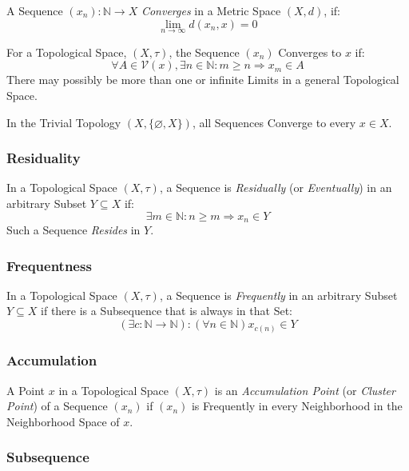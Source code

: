 A Sequence $(x_n) : \mathbb{N} \rightarrow X$
\emph{Converges} in a Metric Space $(X,d)$, if:
\[
  \lim_{n \rightarrow \infty} d (x_n, x) = 0
\]

For a Topological Space, $(X,\tau)$, the Sequence $(x_n)$ Converges to
$x$ if:
\[
  \forall A \in \mathcal{V}(x), \exists n \in \mathbb{N}
  : m \geq n \Rightarrow x_m \in A
\]
There may possibly be more than one or infinite Limits in a general
Topological Space.

In the Trivial Topology $(X, \{\varnothing, X\})$, all Sequences
Converge to every $x \in X$.



\subsubsection{Residuality}\label{sec:reside}

In a Topological Space $(X, \tau)$, a Sequence is \emph{Residually}
(or \emph{Eventually}) in an arbitrary Subset $Y \subseteq X$ if:
\[
  \exists m \in \mathbb{N} : n \geq m \Rightarrow x_n \in Y
\]
Such a Sequence \emph{Resides} in $Y$.



\subsubsection{Frequentness}\label{sec:frequent}

In a Topological Space $(X, \tau)$, a Sequence is \emph{Frequently}
in an arbitrary Subset $Y \subseteq X$ if there is a Subsequence that
is always in that Set:
\[
  (\exists c : \mathbb{N} \rightarrow \mathbb{N})
  : (\forall n \in \mathbb{N}) x_{c(n)} \in Y
\]



\subsubsection{Accumulation}\label{sec:accumulation}

A Point $x$ in a Topological Space $(X, \tau)$ is an
\emph{Accumulation Point} (or \emph{Cluster Point}) of a Sequence
$(x_n)$ if $(x_n)$ is Frequently in every Neighborhood in the
Neighborhood Space of $x$.



\subsubsection{Subsequence}\label{sec:subsequence_topology}

